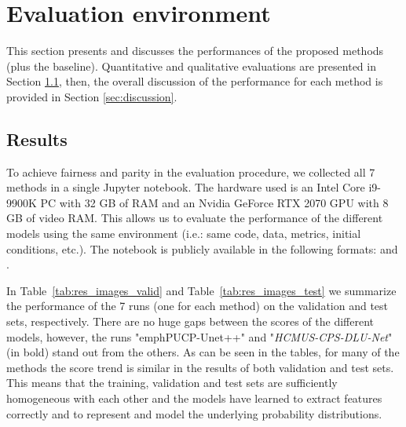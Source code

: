 \documentclass[twocolumn]{article}
\newcommand{\PUCP}[0]{PUCP}\newcommand{\HCMUS}[0]{HCMUS}\newcommand{\baseline}[0]{Baseline}
\newcommand{\Bhref}[3][blue]{\href{#2}{\color{#1}{#3}}}
\begin{document}
\section{Evaluation environment}
\label{sec:results_discussion}
This section presents and discusses the performances of the proposed methods (plus the baseline). Quantitative and qualitative evaluations are presented in Section \ref{sec:eval}, then, the overall discussion of the performance for each method is provided in Section  \ref{sec:discussion}.

\subsection{Results}
\label{sec:eval}
To achieve fairness and parity in the evaluation procedure, we collected all 7 methods in a single Jupyter notebook. The hardware used is an Intel Core i9-9900K PC with 32 GB of RAM and an Nvidia GeForce RTX 2070 GPU with 8 GB of video RAM. This allows us to evaluate the performance of the different models using the same environment (i.e.: same code, data, metrics, initial conditions, etc.). The notebook is publicly available in the following formats:  \Bhref{http://deeplearning.ge.imati.cnr.it/genova-5G/notebooks/shrec-2022-evaluation.html}{html} and \Bhref{http://deeplearning.ge.imati.cnr.it/genova-5G/notebooks/shrec-2022-evaluation.ipynb}{ipynb}. 

In Table~\ref{tab:res_images_valid} and Table~\ref{tab:res_images_test} we summarize the performance of the 7 runs (one for each method) on the validation and test sets, respectively. There are no huge gaps between the scores of the different models, however, the runs "emph{\PUCP{}-Unet++}" and "\emph{\HCMUS{}-CPS-DLU-Net}" (in bold) stand out from the others. As can be seen in the tables, for many of the methods the score trend is similar in the results of both validation and test sets. This means that the training, validation and test sets are sufficiently homogeneous with each other and the models have learned to extract features correctly and to represent and model the underlying probability distributions.
\end{document}
